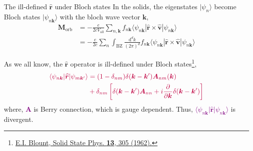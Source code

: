 \documentclass{beamer}
\newcommand{\purple}{\textcolor{purple}}
\begin{document}
    \begin{frame}{The ill-defined \(\widehat{\bm{r}}\) under Bloch states}\small
      In the solids, the eigenstates \(|\psi_n\rangle\) become Bloch states \(|\psi_{n\bm{k}}\rangle\) with the bloch wave vector \(\bm{k}\),
      \begin{subequations}
        \begin{align}
          \bm{M}_{\text{orb}} &= -\frac{e}{2cV_{\text{all}}}\sum_{n,\bm{k}} f_{n\bm{k}} \langle\psi_{n\bm{k}}|\widehat{\bm{r}}\times\widehat{\bm{v}}|\psi_{n\bm{k}}\rangle\\
          &= -\frac{e}{2c}\sum_{n}\int_{\text{BZ}}\frac{\mathrm{d}^dk}{(2\pi)^d} f_{n\bm{k}} \langle\psi_{n\bm{k}}|\widehat{\bm{r}}\times\widehat{\bm{v}}|\psi_{n\bm{k}}\rangle
        \end{align}
      \end{subequations}
      \begin{block}{}
        As we all know, the \(\widehat{\bm{r}}\) operator is ill-defined under Bloch states\footnote{\tiny \href{https://doi.org/10.1016/S0081-1947(08)60459-2}{E.I. Blount, Solid State Phys. \textbf{13}, 305 (1962).}},
      \begin{equation}\color{purple}
        \begin{aligned}
          \langle\psi_{n\bm{k}}|\widehat{\bm{r}}|\psi_{m\bm{k}'}\rangle &= (1-\delta_{nm})\delta(\bm{k}-\bm{k}')\bm{A}_{nm}(\bm{k}) \\
          &+ \delta_{nm}\left[\delta(\bm{k}-\bm{k}')\bm{A}_{nn} + i\dfrac{\partial}{\partial \bm{k}}\delta(\bm{k}-\bm{k}')\right]
        \end{aligned}
      \end{equation}
      where, \purple{\(\bm{A}\)} is Berry connection, which is gauge dependent. Thus, \purple{\(\langle\psi_{n\bm{k}}|\widehat{\bm{r}}|\psi_{n\bm{k}}\rangle\)} is divergent. 
      \end{block}
    \end{frame}
\end{document}
